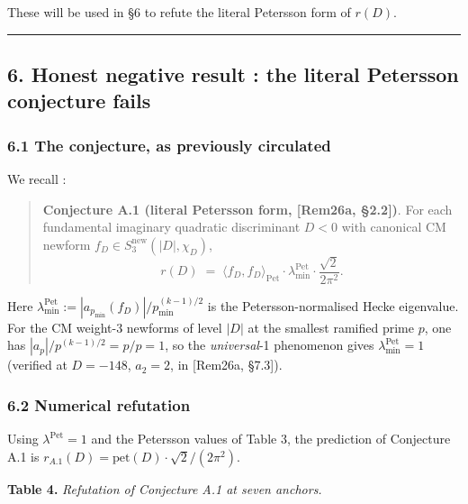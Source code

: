 \documentclass[
  11pt,
  a4paper,
]{amsart}
\begin{document}
These will be used in §6 to refute the literal Petersson form of \(r(D)\).

\begin{center}\rule{0.5\linewidth}{0.5pt}\end{center}

\hypertarget{honest-negative-result-the-literal-petersson-conjecture-fails}{%
\subsection{6. Honest negative result : the literal Petersson conjecture fails}\label{honest-negative-result-the-literal-petersson-conjecture-fails}}

\hypertarget{the-conjecture-as-previously-circulated}{%
\subsubsection{6.1 The conjecture, as previously circulated}\label{the-conjecture-as-previously-circulated}}

We recall :

\begin{quote}
\textbf{Conjecture A.1 (literal Petersson form, {[}Rem26a, §2.2{]})}. For each fundamental imaginary quadratic discriminant \(D < 0\) with canonical CM newform \(f_D \in S_3^{\mathrm{new}}(|D|, \chi_D)\),
\[
r(D) \;=\; \langle f_D, f_D\rangle_{\mathrm{Pet}} \cdot \lambda_{\min}^{\mathrm{Pet}} \cdot \frac{\sqrt 2}{2\pi^{2}}.
\]
\end{quote}

Here \(\lambda_{\min}^{\mathrm{Pet}} := |a_{p_{\min}}(f_D)|/p_{\min}^{(k-1)/2}\) is the Petersson-normalised Hecke eigenvalue. For the CM weight-3 newforms of level \(|D|\) at the smallest ramified prime \(p\), one has \(|a_p|/p^{(k-1)/2} = p/p = 1\), so the \emph{universal}-1 phenomenon gives \(\lambda_{\min}^{\mathrm{Pet}} = 1\) (verified at \(D = -148\), \(a_2 = 2\), in {[}Rem26a, §7.3{]}).

\hypertarget{numerical-refutation}{%
\subsubsection{6.2 Numerical refutation}\label{numerical-refutation}}

Using \(\lambda^{\mathrm{Pet}} = 1\) and the Petersson values of Table 3, the prediction of Conjecture A.1 is \(r_{A.1}(D) = \mathrm{pet}(D)\cdot \sqrt 2/(2\pi^{2})\).

\textbf{Table 4.} \emph{Refutation of Conjecture A.1 at seven anchors.}
\end{document}
